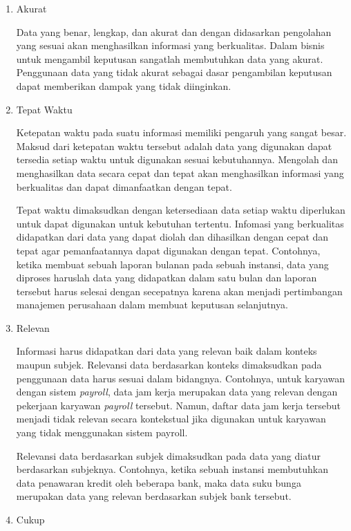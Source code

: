 \begin{enumerate}
	\item Akurat

	Data yang benar, lengkap, dan akurat dan dengan didasarkan pengolahan yang sesuai akan menghasilkan informasi yang berkualitas. Dalam bisnis untuk mengambil keputusan sangatlah membutuhkan data yang akurat. Penggunaan data yang tidak akurat sebagai dasar pengambilan keputusan dapat memberikan dampak yang tidak diinginkan.

	\item Tepat Waktu

	Ketepatan waktu pada suatu informasi memiliki pengaruh yang sangat besar. Maksud dari ketepatan waktu tersebut adalah data yang digunakan dapat tersedia setiap waktu untuk digunakan sesuai kebutuhannya. Mengolah dan menghasilkan data secara cepat dan tepat akan menghasilkan informasi yang berkualitas dan dapat dimanfaatkan dengan tepat.

 Tepat waktu dimaksudkan dengan ketersediaan data setiap waktu diperlukan untuk dapat digunakan untuk kebutuhan tertentu. Infomasi yang berkualitas didapatkan dari data yang dapat diolah dan dihasilkan dengan cepat dan tepat agar pemanfaatannya dapat digunakan dengan tepat. Contohnya, ketika membuat sebuah laporan bulanan pada sebuah instansi, data yang diproses haruslah data yang didapatkan dalam satu bulan dan laporan tersebut harus selesai dengan secepatnya karena akan menjadi pertimbangan manajemen perusahaan dalam membuat keputusan selanjutnya.

	\item Relevan

	Informasi harus didapatkan dari data yang relevan baik dalam konteks maupun subjek. Relevansi data berdasarkan konteks dimaksudkan pada penggunaan data harus sesuai dalam bidangnya. Contohnya, untuk karyawan dengan sistem \textit{payroll}, data jam kerja merupakan data yang relevan dengan pekerjaan karyawan \textit{payroll} tersebut. Namun, daftar data jam kerja tersebut menjadi tidak relevan secara kontekstual jika digunakan untuk karyawan yang tidak menggunakan sistem payroll.

	Relevansi data berdasarkan subjek dimaksudkan pada data yang diatur berdasarkan subjeknya. Contohnya, ketika sebuah instansi membutuhkan data penawaran kredit oleh beberapa bank, maka data suku bunga merupakan data yang relevan berdasarkan subjek bank tersebut.

	\item Cukup


\end{enumerate}
